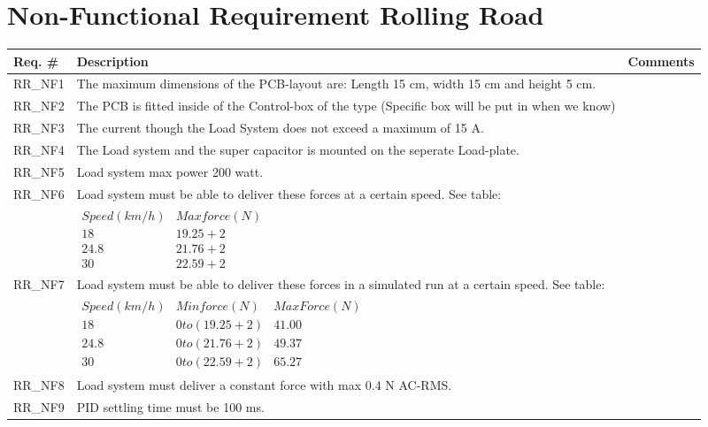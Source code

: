 \section{Non-Functional Requirement Rolling Road}

\begin{table}[h!]
	\label{FREQ_AU2}
	\centering
	\begin{tabular}{|p{2 cm}|p{10 cm}|p{2 cm}|}
		\hline
		\textbf{Req. \#} & \textbf{Description} & \textbf{Comments} \\\hline
		RR\_NF1
		& The maximum dimensions of the PCB-layout are: Length 15 cm, width 15 cm and height 5 cm. 
		&  \\ \hline
		RR\_NF2
		& The PCB is fitted inside of the Control-box of the type (Specific box will be put in when we know)
		& \\ \hline
		RR\_NF3
		& The current though the Load System does not exceed a maximum of 15 A.
		& \\ \hline
		RR\_NF4
		& The Load system and the super capacitor is mounted on the seperate Load-plate.
		& \\ \hline
		RR\_NF5
		& Load system max power 200 watt.
		& \\ \hline
		RR\_NF6 
		& Load system must be able to deliver these forces at a certain speed. See table: 
		& \\ &
		$\begin{array}{c|c}
			Speed (km/h) & Max force (N) \\ 
			18 & 19.25+2 \\ 
			24.8 & 21.76+2 \\ 
			30 & 22.59+2
		\end{array} $
		& \\ \hline
		RR\_NF7
		& Load system must be able to deliver these forces in a simulated run at a certain speed. See table:
		& \\ &
		$\begin{array}{c|c|c}
			Speed (km/h) & Min force (N) & Max Force (N) \\ 
			18 & 0 to (19.25+2) & 41.00 \\ 
			24.8 & 0 to (21.76+2) & 49.37 \\ 
			30 & 0 to (22.59+2) & 65.27
		\end{array}$
		& \\ \hline
		RR\_NF8
		& Load system must deliver a constant force with max 0.4 N AC-RMS. 
		& \\ \hline
		RR\_NF9
		& PID settling time must be 100 ms. 
		&  \\ \hline

\end{tabular}
\end{table}

